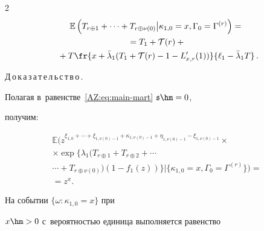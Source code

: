 \begin{multicols}{2}
\begin{multline}
    \mathbb E\left( T_{r\oplus1}+\cdots+T_{r\oplus \nu(0)}\big\vert

    \kappa_{1,0}=x,  \Gamma_0=\Gamma^{(r)}\right)={}    \\ 

    {}=

    T_{1}+\mathcal T(r)+{}\\

    {}+

    T     \fr{x+\bar\lambda_1(T_1+\mathcal T(r)-1-L'_{x,r}(1))}

    {\ell_1-\bar{\lambda}_1 T}\,.\!\!

    \label{AZ:eq:busy-x-r-1}

  \end{multline}



\noindent

Д\,о\,к\,а\,з\,а\,т\,е\,л\,ь\,с\,т\,в\,о\,.\ \

  Полагая в~равенстве~\eqref{AZ:eq:main-mart} $\mathfrak {s}\hm=0$, %

  получим:

  

  \pagebreak

  

  \noindent

  \begin{multline}

    \mathbb{E}\biggl(

    z^{\xi_{1,0}+\cdots+\xi_{1,\nu(0)-1}+%

      \kappa_{1,\nu(0)-1}+\eta_{1,\nu(0)-1}-\xi_{1,\nu(0)-1}}\times

    \\ \times

    \exp\{\lambda_{1}(T_{r\oplus1}+T_{r\oplus2}+\cdots{}\\

    {}\cdots +T_{r\oplus\nu(0)})

    (1-f_{1}(z))\}\Big|\{\kappa_{1,0}=x,\Gamma_{0}=\Gamma^{(r)}\}\biggr)={}\\

    {}=z^x.

    \label{AZ:eq:e4}

\end{multline}

На событии $\{\omega\colon \kappa_{1,0}=x\}$ при

$x\hm>0$ с~вероятностью единица выполняется равенство

\begin{equation*}


\end{equation*}
\end{multicols}
